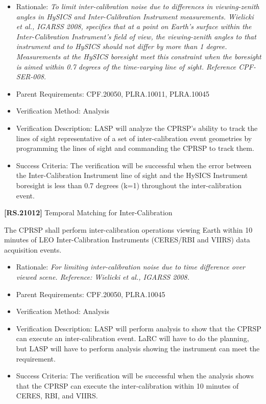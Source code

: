 \documentclass[12pt,oneside,oldfontcommands]{memoir}
\begin{document}
\begin{itemize}
\item{} Rationale: \emph{To limit inter-calibration noise due to differences in viewing-zenith angles in HySICS and Inter-Calibration Instrument measurements. Wielicki et al., IGARSS 2008, specifies that at a point on Earth's surface within the Inter-Calibration Instrument's field of view, the viewing-zenith angles to that instrument and to HySICS should not differ by more than 1 degree. Measurements at the HySICS boresight meet this constraint when the boresight is aimed within 0.7 degrees of the time-varying line of sight. Reference CPF-SER-008.}

\item{} Parent Requirements: \gls{CPF}.20050, PLRA.10011, PLRA.10045

\item{} Verification Method: Analysis

\item{} Verification Description: \gls{LASP} will analyze the \gls{CPRSP}'s ability to track the lines of sight representative of a set of inter-calibration event geometries by programming the lines of sight and commanding the \gls{CPRSP} to track them.

\item{} Success Criteria: The verification will be successful when the error between the Inter-Calibration Instrument line of sight and the \gls{HySICS} Instrument boresight is less than 0.7 degrees (k=1) throughout the inter-calibration event.

\end{itemize}

\textbf{[RS.21012]} Temporal Matching for Inter-Calibration

The \gls{CPRSP} shall perform inter-calibration operations viewing Earth within 10 minutes of \gls{LEO} Inter-Calibration Instruments (CERES\slash RBI and VIIRS) data acquisition events.

\begin{itemize}
\item{} Rationale: \emph{For limiting inter-calibration noise due to time difference over viewed scene. Reference: Wielicki et al., IGARSS 2008.}

\item{} Parent Requirements: \gls{CPF}.20050, PLRA.10045

\item{} Verification Method: Analysis

\item{} Verification Description: \gls{LASP} will perform \gls{analysis} to show that the \gls{CPRSP} can execute an inter-calibration event. \gls{LaRC} will have to do the planning, but \gls{LASP} will have to perform \gls{analysis} showing the instrument can meet the requirement.

\item{} Success Criteria: The verification will be successful when the \gls{analysis} shows that the \gls{CPRSP} can execute the inter-calibration within 10 minutes of \gls{CERES}, \gls{RBI}, and \gls{VIIRS}.

\end{itemize}
\end{document}
